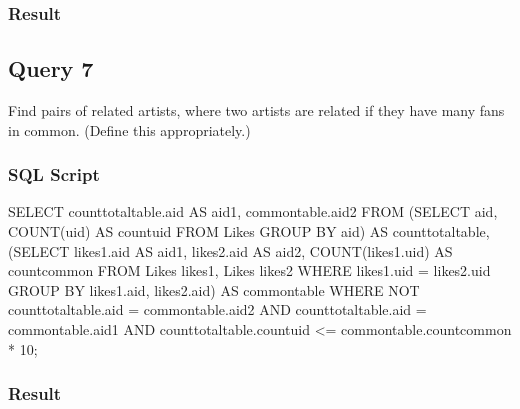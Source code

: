 \documentclass[letterpaper, 12pt]{report}
\begin{document}
	\subsubsection{Result}
	
	\subsection{Query 7}
	Find pairs of related artists, where two artists are related if they have many fans in common. (Define
	this appropriately.)
	\subsubsection{SQL Script}
	\begin{spverbatim}
		SELECT counttotaltable.aid AS aid1, commontable.aid2
		FROM (SELECT aid, COUNT(uid) AS countuid FROM Likes GROUP BY aid) AS counttotaltable,
		(SELECT likes1.aid AS aid1, likes2.aid AS aid2, COUNT(likes1.uid) AS countcommon
		FROM Likes likes1, Likes likes2
		WHERE likes1.uid = likes2.uid
		GROUP BY likes1.aid, likes2.aid) AS commontable
		WHERE NOT counttotaltable.aid = commontable.aid2
		AND counttotaltable.aid = commontable.aid1
		AND counttotaltable.countuid <= commontable.countcommon * 10;
	\end{spverbatim}
	\subsubsection{Result}
\end{document}
